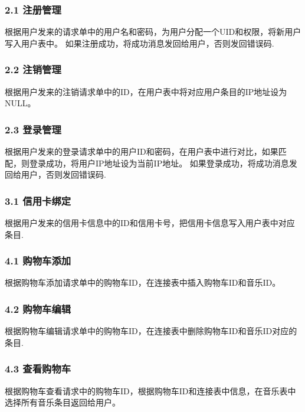 \subsubsection{2.1 注册管理 }

根据用户发来的请求单中的用户名和密码，为用户分配一个UID和权限，将新用户写入用户表中。
如果注册成功，将成功消息发回给用户，否则发回错误码.

\subsubsection{2.2 注销管理 }

根据用户发来的注销请求单中的ID，在用户表中将对应用户条目的IP地址设为NULL。

\subsubsection{2.3 登录管理 }

根据用户发来的登录请求单中的用户ID和密码，在用户表中进行对比，如果匹配，则登录成功，将用户IP地址设为当前IP地址。
如果登录成功，将成功消息发回给用户，否则发回错误码.

\subsubsection{3.1 信用卡绑定 }

根据用户发来的信用卡信息中的ID和信用卡号，把信用卡信息写入用户表中对应条目.

\subsubsection{4.1 购物车添加 }

根据购物车添加请求单中的购物车ID，在连接表中插入购物车ID和音乐ID。

\subsubsection{4.2 购物车编辑 }

根据购物车编辑请求单中的购物车ID，在连接表中删除购物车ID和音乐ID对应的条目.

\subsubsection{4.3 查看购物车 }

根据购物车查看请求中的购物车ID，根据购物车ID和连接表中信息，在音乐表中选择所有音乐条目返回给用户。

